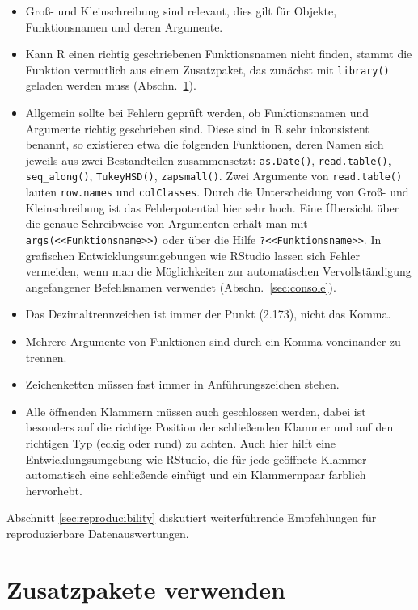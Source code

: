 \begin{itemize}
\item Groß- und Kleinschreibung sind relevant, dies gilt für Objekte, Funktionsnamen und deren Argumente.
\item Kann R einen richtig geschriebenen Funktionsnamen nicht finden, stammt die Funktion vermutlich aus einem Zusatzpaket, das zunächst mit \lstinline!library()! geladen werden muss (Abschn.\ \ref{sec:packages}).
\item Allgemein sollte bei Fehlern geprüft werden, ob Funktionsnamen und Argumente richtig geschrieben sind. Diese sind in R sehr inkonsistent benannt, so existieren etwa die folgenden Funktionen, deren Namen sich jeweils aus zwei Bestandteilen zusammensetzt: \lstinline!as.Date()!, \lstinline!read.table()!, \lstinline!seq_along()!, \lstinline!TukeyHSD()!, \lstinline!zapsmall()!. Zwei Argumente von \lstinline!read.table()! lauten \lstinline!row.names! und \lstinline!colClasses!. Durch die Unterscheidung von Groß- und Kleinschreibung ist das Fehlerpotential hier sehr hoch. Eine Übersicht über die genaue Schreibweise von Argumenten erhält man mit \lstinline!args(<<Funktionsname>>)! oder über die Hilfe \lstinline!?<<Funktionsname>>!. In grafischen Entwicklungsumgebungen wie RStudio lassen sich Fehler vermeiden, wenn man die Möglichkeiten zur automatischen  Vervollständigung angefangener Befehlsnamen verwendet (Abschn.\ \ref{sec:console}).
\item Das Dezimaltrennzeichen ist immer der Punkt (2.173), nicht das Komma.
\item Mehrere Argumente von Funktionen sind durch ein Komma voneinander zu trennen.
\item Zeichenketten müssen fast immer in Anführungszeichen stehen.
\item Alle öffnenden Klammern müssen auch geschlossen werden, dabei ist besonders auf die richtige Position der schließenden Klammer und auf den richtigen Typ (eckig oder rund) zu achten. Auch hier hilft eine Entwicklungsumgebung wie RStudio, die für jede geöffnete Klammer automatisch eine schließende einfügt und ein Klammernpaar farblich hervorhebt.
\end{itemize}

Abschnitt \ref{sec:reproducibility} diskutiert weiterführende Empfehlungen für reproduzierbare Datenauswertungen.

\section{Zusatzpakete verwenden}
\label{sec:packages}

